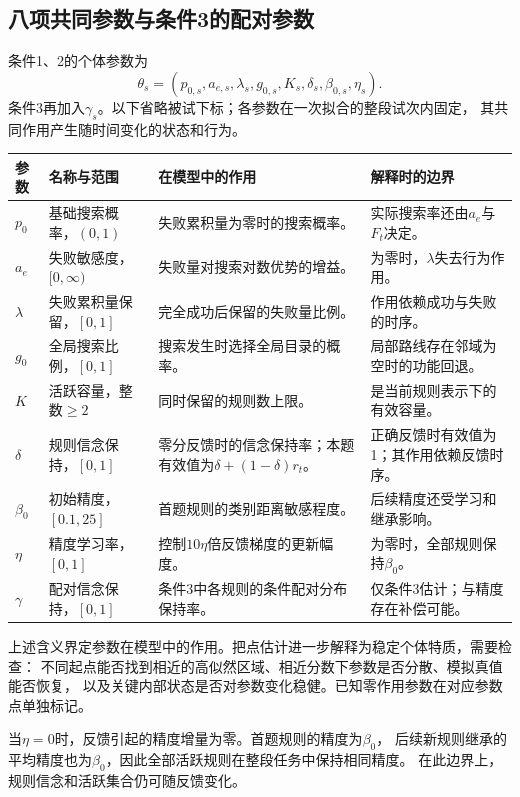 \documentclass[11pt,a4paper]{article}
\numberwithin{equation}{section}
\begin{document}
\subsection{八项共同参数与条件3的配对参数}
\label{sec:parameters}
条件1、2的个体参数为
\begin{equation}
\theta_s=(p_{0,s},a_{e,s},\lambda_s,g_{0,s},K_s,\delta_s,\beta_{0,s},\eta_s).
\label{eq:parameters}
\end{equation}
条件3再加入$\gamma_s$。以下省略被试下标；各参数在一次拟合的整段试次内固定，
其共同作用产生随时间变化的状态和行为。

{\small
\begin{longtable}{L{1.3cm}L{3.0cm}L{5.2cm}L{4.7cm}}
\toprule
参数 & 名称与范围 & 在模型中的作用 & 解释时的边界\\
\midrule\endhead
$p_0$ & 基础搜索概率，$(0,1)$ & 失败累积量为零时的搜索概率。 & 实际搜索率还由$a_e$与$F_t$决定。\\
$a_e$ & 失败敏感度，$[0,\infty)$ & 失败量对搜索对数优势的增益。 & 为零时，$\lambda$失去行为作用。\\
$\lambda$ & 失败累积量保留，$[0,1]$ & 完全成功后保留的失败量比例。 & 作用依赖成功与失败的时序。\\
$g_0$ & 全局搜索比例，$[0,1]$ & 搜索发生时选择全局目录的概率。 & 局部路线存在邻域为空时的功能回退。\\
$K$ & 活跃容量，整数$\geq2$ & 同时保留的规则数上限。 & 是当前规则表示下的有效容量。\\
$\delta$ & 规则信念保持，$[0,1]$ & 零分反馈时的信念保持率；本题有效值为$\delta+(1-\delta)r_t$。 & 正确反馈时有效值为1；其作用依赖反馈时序。\\
$\beta_0$ & 初始精度，$[0.1,25]$ & 首题规则的类别距离敏感程度。 & 后续精度还受学习和继承影响。\\
$\eta$ & 精度学习率，$[0,1]$ & 控制$10\eta$倍反馈梯度的更新幅度。 & 为零时，全部规则保持$\beta_0$。\\
$\gamma$ & 配对信念保持，$[0,1]$ & 条件3中各规则的条件配对分布保持率。 & 仅条件3估计；与精度存在补偿可能。\\
\bottomrule
\end{longtable}}

上述含义界定参数在模型中的作用。把点估计进一步解释为稳定个体特质，需要检查：
不同起点能否找到相近的高似然区域、相近分数下参数是否分散、模拟真值能否恢复，
以及关键内部状态是否对参数变化稳健。已知零作用参数在对应参数点单独标记。

当$\eta=0$时，反馈引起的精度增量为零。首题规则的精度为$\beta_0$，
后续新规则继承的平均精度也为$\beta_0$，因此全部活跃规则在整段任务中保持相同精度。
在此边界上，规则信念和活跃集合仍可随反馈变化。
\end{document}

